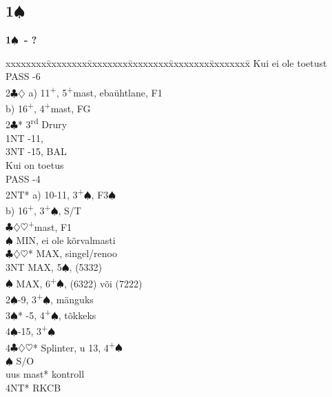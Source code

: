 \documentclass[10pt]{article}
\renewcommand{\c}{$\clubsuit$}
\renewcommand{\d}{$\diamondsuit$}
\newcommand{\h}{$\heartsuit$}
\newcommand{\s}{$\spadesuit$}
\newcommand{\p}{\textsuperscript{+}}
\newcommand{\rdh}{3\textsuperscript{rd}}
\newenvironment{bidtable}[1][]
{\textbf{#1}
  \begin{adjustwidth}{1em}{}
    \addvspace{2pt}
    \begin{tabbing}
      xxxxxxxx\=xxxxxxxx\=xxxxxxxx\=xxxxxxxx\=xxxxxxxx\=xxxxxxxx\=\kill}
{\end{tabbing}\end{adjustwidth}\bigskip}%
\newcommand{\pdfs}{\texorpdfstring{\s{}}{S}}
\begin{document}
\begin{multicols*}{2}


\subsection{1\pdfs}

\textbf{1\s\ - ?}
\begin{bidtable}
Kui ei ole toetust                                      \\
PASS      -6                                        \\
2\c\d     \> a) 11\p, 5\p mast, ebaühtlane, F1          \\
          \> b) 16\p, 4\p mast, FG                      \\
2\c* \rdh \> Drury                                      \\
1NT       -11,                                      \\
3NT       -15, BAL                                 \\
Kui on toetus                                           \\
PASS      -4                                        \\
2NT*      \> a) 10-11, 3\p\s, F3\s                      \\
          \> b) 16\p, 3\p\s, S/T                        \\
          \c\d\h   {}\p mast, F1                  \\
          \s       \> MIN, ei ole kõrvalmasti       \\
          \c\d\h*  \> MAX, singel/renoo             \\
          \> 3NT       \> MAX, 5\s, (5332)              \\
          \s       \> MAX, 6\p\s, (6322) või (7222) \\
2\s       {}-9, 3\p\s, mänguks                        \\
3\s*      {}-5, 4\p\s, tõkkeks                        \\
4\s       {}-15, 3\p\s                               \\
4\c\d\h*  \> Splinter, u 13, 4\p\s                      \\
          \s       \> S/O                           \\
          \> uus mast* \> kontroll                      \\
          \> 4NT*      \> RKCB
\end{bidtable}


\end{multicols*}
\end{document}
